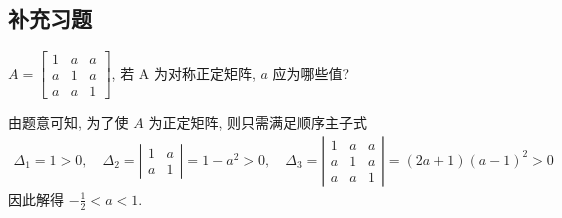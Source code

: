 \subsection{补充习题}

  \begin{tcolorbox}[enhanced,colback=10,colframe=9,breakable,coltitle=green!25!black,title=2024]
  
$ A=\left[\begin{array}{lll}1 & a & a \\ a & 1 & a \\ a & a & 1\end{array}\right] $, 若 $ \mathrm{A} $ 为对称正定矩阵, $ a $ 应为哪些值?

\tcblower
 由题意可知, 为了使 $ A $ 为正定矩阵, 则只需满足顺序主子式
$$
\begin{array}{l}
\Delta_{1}=1>0, \quad \Delta_{2}=\left|\begin{array}{cc}
1 & a \\
a & 1
\end{array}\right|=1-a^{2}>0 ,\quad
\Delta_{3}=\left|\begin{array}{lll}
1 & a & a \\
a & 1 & a \\
a & a & 1
\end{array}\right|=(2 a+1)(a-1)^{2}>0
\end{array}
$$
因此解得 $ -\frac{1}{2}<a<1 $.
\end{tcolorbox}


